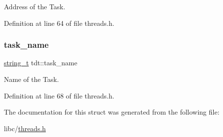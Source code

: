 Address of the Task. 



Definition at line 64 of file threads.\+h.

\mbox{\label{a00107_a46234f76421730447633c8b3d988ec23_a46234f76421730447633c8b3d988ec23}} 
\subsubsection{\texorpdfstring{task\+\_\+name}{task\_name}}
{\footnotesize\ttfamily \hyperlink{a00053_ab0dcbec9b4b3c60b939b1095f93cb1b9_ab0dcbec9b4b3c60b939b1095f93cb1b9}{string\+\_\+t} tdt\+::task\+\_\+name}



Name of the Task. 



Definition at line 68 of file threads.\+h.



The documentation for this struct was generated from the following file\+:\begin{DoxyCompactItemize}
\item 
libc/\hyperlink{a00065}{threads.\+h}\end{DoxyCompactItemize}
